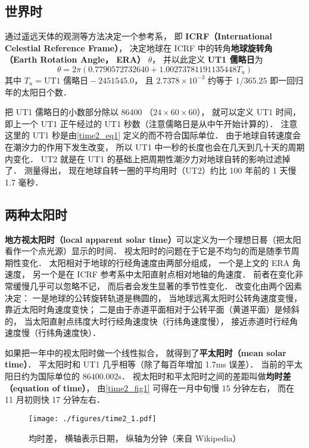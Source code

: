 

\subsection{世界时}
通过遥远天体的观测等方法决定一个参考系， 即 \textbf{ICRF（International Celestial Reference Frame）}， 决定地球在 ICRF 中的转角\textbf{地球旋转角（Earth Rotation Angle， ERA）} $\theta$， 并以此定义 \textbf{UT1 儒略日}为
\begin{equation}\label{time2_eq1}
\theta = 2\pi(0.7790572732640 + 1.00273781191135448 T_u)
\end{equation}
其中 $T_u = \text{UT1 儒略日} - 2451545.0$， 且 $2.7378\times 10^{-3}$ 约等于 $1/365.25$ 即一回归年的太阳日个数．

把 UT1 儒略日的小数部分除以 86400 （$24\times 60\times 60$）， 就可以定义 UT1 时间， 即上一个 UT1 正午经过的 UT1 秒数（注意儒略日是从中午开始计算的）． 注意这里的 UT1 秒是由\autoref{time2_eq1} 定义的而不符合国际单位． 由于地球自转速度会在潮汐力的作用下发生改变， 所以 UT1 中一秒的长度也会在几天到几十天的周期内变化． UT2 就是在 UT1 的基础上把周期性潮汐力对地球自转的影响过滤掉了． 测量得出， 现在地球自转一圈的平均用时（UT2）约比 100 年前的 1 天慢 1.7 毫秒．

\subsection{两种太阳时}
\textbf{地方视太阳时（local apparent solar time）}可以定义为一个理想日晷（把太阳看作一个点光源）显示的时间． 视太阳时的问题在于它是不均匀的而是随季节周期性变化． 太阳相对于地球的行经角速度由两部分组成， 一个是上文的 ERA 角速度， 另一个是在 ICRF 参考系中太阳直射点相对地轴的角速度． 前者在变化非常缓慢几乎可以忽略不记， 而后者会发生显著的季节性变化． 改变化由两个因素决定： 一是地球的公转旋转轨道是椭圆的， 当地球远离太阳时公转角速度变慢， 靠近太阳时角速度变快； 二是由于赤道平面相对于公转平面（黄道平面）是倾斜的， 当太阳直射点纬度大时行经角速度快（行纬角速度慢）， 接近赤道时行经角速度慢（行纬角速度快）．

如果把一年中的视太阳时做一个线性拟合， 就得到了\textbf{平太阳时（mean solar time）}． 平太阳时和 UT1 几乎相等（除了每百年增加 1.7ms 误差）． 当前的平太阳日约为国际单位的 $86400.002\mathrm{s}$． 视太阳时和平太阳时之间的差距叫做\textbf{均时差（equation of time）}， 由\autoref{time2_fig1} 可得在一月中旬慢 15 分钟左右， 而在 11 月初则快 17 分钟左右．

\begin{figure}[ht]
\centering
\texttt{[image: ./figures/time2\_1.pdf]}
\caption{均时差， 横轴表示日期， 纵轴为分钟（来自 Wikipedia）} \label{time2_fig1}
\end{figure}
